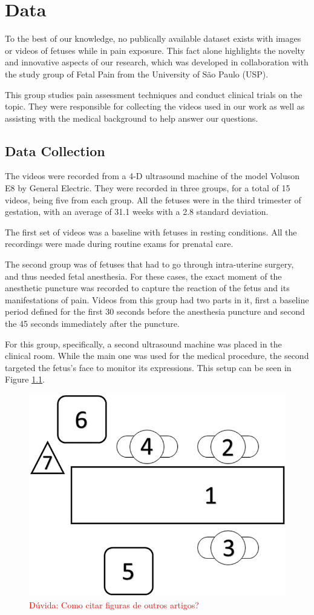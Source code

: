 \chapter{Data}

To the best of our knowledge, no publically available dataset exists with images or videos of fetuses while in pain exposure. This fact alone highlights the novelty and innovative aspects of our research, which was developed in collaboration with the study group of Fetal Pain from the University of São Paulo (USP). 

This group studies pain assessment techniques and conduct clinical trials on the topic. They were responsible for collecting the videos used in our work as well as assisting with the medical background to help answer our questions.

\section{Data Collection}

The videos were recorded from a 4-D ultrasound machine of the model Voluson E8 by General Electric. They were recorded in three groups, for a total of 15 videos, being five from each group. All the fetuses were in the third trimester of gestation, with an average of 31.1 weeks with a 2.8 standard deviation.

The first set of videos was a baseline with fetuses in resting conditions. All the recordings were made during routine exams for prenatal care.

The second group was of fetuses that had to go through intra-uterine surgery, and thus needed fetal anesthesia. For these cases, the exact moment of the anesthetic puncture was recorded to capture the reaction of the fetus and its manifestations of pain. Videos from this group had two parts in it, first a baseline period defined for the first 30 seconds before the anesthesia puncture and second the 45 seconds immediately after the puncture.

For this group, specifically, a second ultrasound machine was placed in the clinical room. While the main one was used for the medical procedure, the second targeted the fetus's face to monitor its expressions. This setup can be seen in Figure \ref{fig:ultrasound}.

\begin{figure}[h!tp]
    \centering
    \includegraphics[width=.35\textwidth]{imgs/chap03_ultrasound_setup.jpg}
    \caption{\textcolor{red}{Dúvida: Como citar figuras de outros artigos?}}
    \label{fig:ultrasound}
\end{figure}

